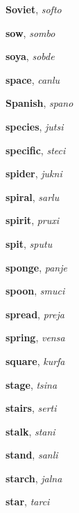 \documentclass[12pt]{book}
\begin{document}
\begin{description}
\item[ ] \textbf{Soviet}, \textit{softo}

\item[ ] \textbf{sow}, \textit{sombo}

\item[ ] \textbf{soya}, \textit{sobde}

\item[ ] \textbf{space}, \textit{canlu}

\item[ ] \textbf{Spanish}, \textit{spano}

\item[ ] \textbf{species}, \textit{jutsi}

\item[ ] \textbf{specific}, \textit{steci}

\item[ ] \textbf{spider}, \textit{jukni}

\item[ ] \textbf{spiral}, \textit{sarlu}

\item[ ] \textbf{spirit}, \textit{pruxi}

\item[ ] \textbf{spit}, \textit{sputu}

\item[ ] \textbf{sponge}, \textit{panje}

\item[ ] \textbf{spoon}, \textit{smuci}

\item[ ] \textbf{spread}, \textit{preja}

\item[ ] \textbf{spring}, \textit{vensa}

\item[ ] \textbf{square}, \textit{kurfa}

\item[ ] \textbf{stage}, \textit{tsina}

\item[ ] \textbf{stairs}, \textit{serti}

\item[ ] \textbf{stalk}, \textit{stani}

\item[ ] \textbf{stand}, \textit{sanli}

\item[ ] \textbf{starch}, \textit{jalna}

\item[ ] \textbf{star}, \textit{tarci}


\end{description}
\end{document}
